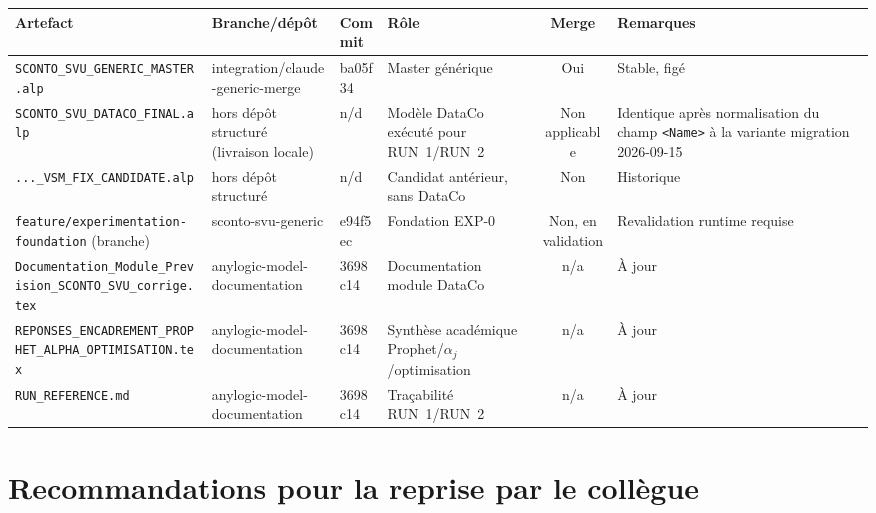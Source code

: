 \documentclass[11pt,a4paper]{article}
\newcommand{\code}[1]{\texttt{#1}}
\begin{document}
\begin{center}
\small
\begin{tabularx}{\textwidth}{p{3.2cm}p{2.6cm}p{1.6cm}Xcp{1.6cm}}
\toprule
Artefact & Branche/dépôt & Commit & Rôle & Merge & Remarques \\
\midrule
\code{SCONTO\_SVU\_\allowbreak GENERIC\_\allowbreak MASTER.alp} & integration/claude-\allowbreak generic-merge & ba05f34 & Master générique & Oui & Stable, figé \\
\code{SCONTO\_SVU\_\allowbreak DATACO\_FINAL.alp} & hors dépôt structuré (livraison locale) & n/d & Modèle DataCo exécuté pour RUN~1/RUN~2 & Non applicable & Identique après normalisation du champ \code{<Name>} à la variante migration 2026-09-15 \\
\code{...\_VSM\_FIX\_\allowbreak CANDIDATE.alp} & hors dépôt structuré & n/d & Candidat antérieur, sans DataCo & Non & Historique \\
\code{feature/\allowbreak experimentation-\allowbreak foundation} (branche) & sconto-svu-\allowbreak generic & e94f5ec & Fondation EXP-0 & Non, en validation & Revalidation runtime requise \\
\code{Documentation\_\allowbreak Module\_\allowbreak Prevision\_\allowbreak SCONTO\_SVU\_\allowbreak corrige.tex} & anylogic-model-\allowbreak documentation & 3698c14 & Documentation module DataCo & n/a & À jour \\
\code{REPONSES\_\allowbreak ENCADREMENT\_\allowbreak PROPHET\_ALPHA\_\allowbreak OPTIMISATION.tex} & anylogic-model-\allowbreak documentation & 3698c14 & Synthèse académique Prophet/\allowbreak$\alpha_j$/\allowbreak optimisation & n/a & À jour \\
\code{RUN\_\allowbreak REFERENCE.md} & anylogic-model-\allowbreak documentation & 3698c14 & Traçabilité RUN~1/RUN~2 & n/a & À jour \\
\bottomrule
\end{tabularx}
\end{center}

\section{Recommandations pour la reprise par le collègue}
\end{document}
